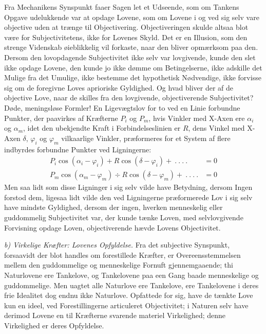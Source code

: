 \documentclass[12pt,a4paper]{book}
\newcommand{\runin}[1]{\emph{#1}\hspace{0.4em}}
\begin{document}
Fra Mechanikens Synspunkt faaer Sagen let et Udseende, som om Tankens
Opgave udelukkende var at opdage Lovene, som om Lovene i og ved sig selv
vare objective uden at trænge til Objectivering. Objectiveringen skulde
altsaa blot være for Subjectivitetens, ikke for Lovenes Skyld. Det er en
Illusion, som den strenge Videnskab øieblikkelig vil forkaste, naar den
bliver opmærksom paa den. Dersom den lovopdagende Subjectivitet ikke
selv var lovgivende, kunde
den slet ikke opdage Lovene, den kunde jo ikke dømme om Betingelserne,
ikke adskille det Mulige fra det Umulige, ikke bestemme det hypothetisk
Nødvendige, ikke forvisse sig om de foregivne Loves aprioriske
Gyldighed. Og hvad bliver der af de objective Love, naar de skilles fra
den lovgivende, objectiverende Subjectivitet? Døde, meningsløse Formler!
En Ligevægtslov for to ved en Linie forbundne Punkter, der paavirkes af
Kræfterne $P_i$ og $P_m$, hvis Vinkler med X-Axen ere $\alpha_i$ og
$\alpha_m$, idet den ubekjendte Kraft i Forbindelseslinien er $R$, dens
Vinkel med X-Axen $\delta$, $\varphi_i$ og $\varphi_m$ vilkaarlige
Vinkler, præformeres for et System af flere indbyrdes forbundne Punkter
ved Ligningerne:
\begin{align*}
P_i \cos (\alpha_i - \varphi_i) + R \cos (\delta - \varphi_i) + \ .\ .\ .\ . &= 0\\
P_m \cos (\alpha_m - \varphi_m) \div R \cos (\delta - \varphi_m) + \ .\ .\ .\ . &= 0
\end{align*}
Men saa lidt som disse Ligninger i sig selv vilde have Betydning, dersom
Ingen forstod dem, ligesaa lidt vilde den ved Ligningerne præformerede
Lov i sig selv have mindste Gyldighed, dersom der ingen, hverken
menneskelig eller guddommelig Subjectivitet var, der kunde tænke Loven,
med selvlovgivende Forvisning opdage Loven, objectiverende hævde Lovens
Objectivitet.

\runin{b) Virkelige Kræfter: Lovenes Opfyldelse.} Fra det subjective
Synspunkt, forsaavidt der blot handles om forestillede Kræfter, er
Overeensstemmelsen mellem den guddommelige og menneskelige Fornuft
gjennemgaaende; thi Naturlovene ere Tankelove, og Tankelovene paa een
Gang baade menneskelige og guddommelige. Men uagtet alle Naturlove ere
Tankelove, ere Tankelovene i deres frie Idealitet dog endnu ikke
Naturlove. Opfattede for sig, have de tænkte Love kun en ideel, ved
Forestillingerne articuleret Objectivitet; i Naturen selv have derimod
Lovene en til Kræfterne svarende materiel Virkelighed; denne Virkelighed
er deres Opfyldelse.
\end{document}
